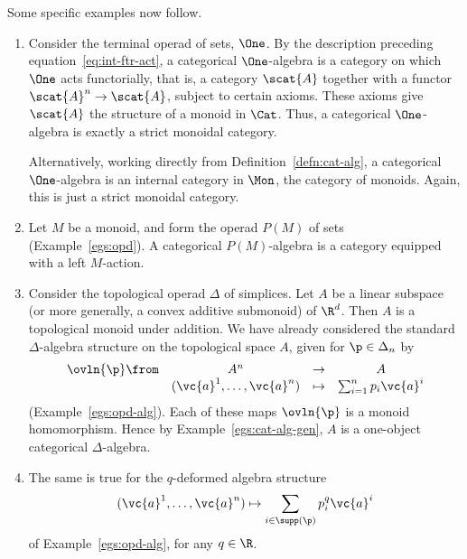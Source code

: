 Some specific examples now follow.

\begin{examples}
\begin{enumerate}
\item 
Consider the terminal%
% 
%
% 
operad of sets, $\One$.  By the description preceding
equation~\eqref{eq:int-ftr-act}, a categorical $\One$-algebra is a category
on which $\One$ acts functorially, that is, a category $\scat{A}$ together
with a functor $\scat{A}^n \to \scat{A}$, subject to certain axioms.  These
axioms give $\scat{A}$ the structure of a monoid in $\Cat$.  Thus, a
categorical $\One$-algebra is exactly a strict monoidal category.

Alternatively, working directly from Definition~\ref{defn:cat-alg}, a
categorical $\One$-algebra is an internal category in $\Mon$, the category
of monoids.  Again, this is just a strict monoidal category.

\item
{}
Let $M$ be a monoid,%
%
%
% 
and form the operad $P(M)$ of sets (Example~\ref{egs:opd}).
A categorical $P(M)$-algebra is a category equipped with a left $M$-action.

\item
{}
Consider the topological operad $\Delta$%
%
%
%
% 
of simplices.  Let $A$ be a linear subspace (or more generally, a convex
additive submonoid) of $\R^d$.  Then $A$ is a topological monoid under
addition.  We have already considered the standard%
%
%
$\Delta$-algebra structure on the topological space $A$, given for
$\p \in \Delta_n$ by
\[
\begin{array}{cccc}
\ovln{\p}\from  &
A^n                             &\to            &
A      \\
&
(\vc{a}^1, \ldots, \vc{a}^n)    &\mapsto        &
\sum_{i = 1}^n p_i \vc{a}^i
\end{array}
\]
(Example~\ref{egs:opd-alg}).  Each of these maps
$\ovln{\p}$ is a monoid homomorphism. Hence
by Example~\ref{egs:cat-alg-gen}, $A$ is a
one-object categorical $\Delta$-algebra.

\item
{}
The same is true for the $q$-deformed%
%
%
algebra structure
\[
(\vc{a}^1, \ldots, \vc{a}^n)
\mapsto
\sum_{i \in \supp(\p)} p_i^q \vc{a}^i
\]
of Example~\ref{egs:opd-alg}, for any $q \in \R$.  
\end{enumerate}
\end{examples}

